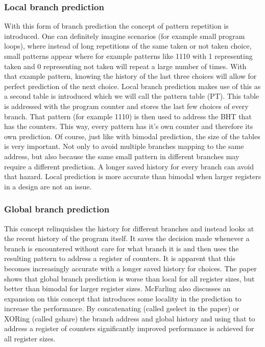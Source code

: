 \subsubsection{Local branch prediction}
With this form of branch prediction the concept of pattern repetition is introduced. One can definitely imagine scenarios (for example small program loops), where instead of long repetitions of the same taken or not taken choice, small patterns appear where for example patterns like 1110 with 1 representing taken and 0 representing not taken will repeat a large number of times. With that example pattern, knowing the history of the last three choices will allow for perfect prediction %
of the next choice. Local branch prediction makes use of this as a second table is introduced which we will call the pattern table (PT). This table is addressed with the program counter and stores the last few choices of every branch. That pattern (for example 1110) is then used to address the BHT that has the counters. This way, every pattern has it's own counter and therefore its own prediction. Of course, just like with bimodal prediction, the size of the tables is very important. Not only to avoid multiple branches mapping to the same address, but also because the same small pattern in different branches may require a different prediction. A longer saved history for every branch can avoid that hazard. Local prediction is more accurate than bimodal when larger registers in a design are not an issue.
\subsubsection{Global branch prediction}
This concept relinquishes the history for different branches and instead looks at the recent history of the program itself. It saves the decision made whenever a branch is encountered without care for what branch it is and then uses the resulting pattern to address a register of counters. It is apparent that this becomes increasingly accurate with a longer saved history for choices. The paper shows that global branch prediction is worse than local for all register sizes, but better than bimodal for larger register sizes. McFarling also discusses an expansion on this concept that introduces some locality in the prediction to increase the performance. By concatenating (called gselect in the paper) or XORing (called gshare) the branch address and global history and using that to address a register of counters significantly improved performance is achieved for all register sizes.
